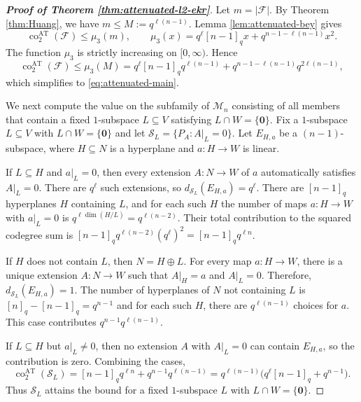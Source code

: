 \documentclass[11pt]{article}
\theoremstyle{definition}
\begin{document}
\vskip 3mm
\begin{proof}[\bfseries{Proof of Theorem \ref{thm:attenuated-l2-ekr}}]
Let $m=|\mathcal F|$.  By Theorem \ref{thm:Huang}, we have $m\le M:=q^{\ell(n-1)}$. Lemma \ref{lem:attenuated-bey} gives
\[
\operatorname{co}^{\mathrm{AT}}_2(\mathcal F)\le \mu_3(m),
\qquad
\mu_3(x)=q^\ell[n-1]_qx+q^{n-1-\ell(n-1)}x^2.
\]
The function $\mu_3$ is strictly increasing on $[0,\infty)$.  Hence
\[
\operatorname{co}^{\mathrm{AT}}_2(\mathcal F)
\le \mu_3(M)
=q^\ell[n-1]_qq^{\ell(n-1)}
+q^{n-1-\ell(n-1)}q^{2\ell(n-1)},
\]
which simplifies to \eqref{eq:attenuated-main}.

We next compute the value on the subfamily of $\mathcal M_n$ consisting of all members that contain a fixed $1$-subspace $L\subseteq V$ satisfying $L\cap W=\{\bm{0}\}$. Fix a $1$-subspace $L\subseteq V$ with $L\cap W=\{\bm{0}\}$ and let $\mathcal S_L=\{P_A:A|_L=0\}$. Let $E_{H,a}$ be a $(n-1)$-subspace, where $H\subseteq N$ is a hyperplane and $a:H\to W$ is linear.

If $L\subseteq H$ and $a|_L=0$, then every extension $A:N\to W$ of $a$ automatically satisfies $A|_L=0$.  There are $q^\ell$ such extensions, so $d_{\mathcal S_L}(E_{H,a})=q^\ell$. There are $[n-1]_q$ hyperplanes $H$ containing $L$, and for each such $H$ the number of maps $a:H\to W$ with $a|_L=0$ is $q^{\ell\dim(H/L)}=q^{\ell(n-2)}$. 
Their total contribution to the squared codegree sum is $[n-1]_q q^{\ell(n-2)}(q^\ell)^2=[n-1]_q q^{\ell n}$.

If $H$ does not contain $L$, then $N=H\oplus L$.  For every map $a:H\to W$, there is a unique extension $A:N\to W$ such that $A|_H=a$ and $A|_L=0$.  Therefore, $d_{\mathcal S_L}(E_{H,a})=1$. 
The number of hyperplanes of $N$ not containing $L$ is $[n]_q-[n-1]_q=q^{n-1}$ and for each such $H$, there are $q^{\ell(n-1)}$ choices for $a$. This case contributes $q^{n-1}q^{\ell(n-1)}$.

If $L\subseteq H$ but $a|_L\ne0$, then no extension $A$ with $A|_L=0$ can contain $E_{H,a}$, so the contribution is zero. Combining the cases,
\[
\operatorname{co}^{\mathrm{AT}}_2(\mathcal S_L)
=[n-1]_qq^{\ell n}+q^{n-1}q^{\ell(n-1)}
=q^{\ell(n-1)}\bigl(q^\ell[n-1]_q+q^{n-1}\bigr).
\]
Thus $\mathcal S_L$ attains the bound for a fixed $1$-subspace $L$ with $L\cap W=\{\bm{0}\}$.


\end{proof}
\end{document}
